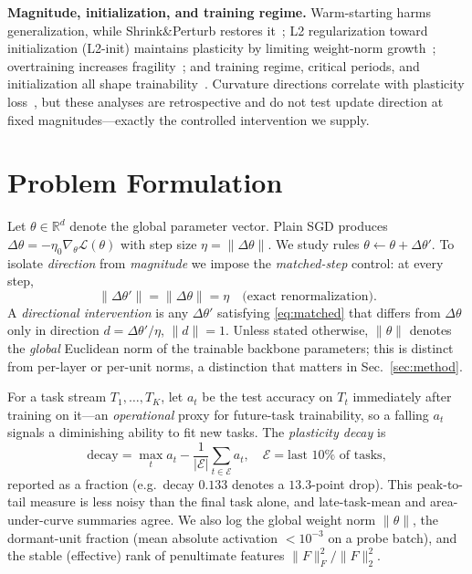 \documentclass[conference]{IEEEtran}
\begin{document}
\textbf{Magnitude, initialization, and training regime.} Warm-starting harms
generalization, while Shrink\&Perturb restores it~\cite{ash2020}; L2 regularization
toward initialization (L2-init) maintains plasticity by limiting weight-norm
growth~\cite{kumar2023}; overtraining increases fragility~\cite{springer2025}; and
training regime, critical periods, and initialization all shape
trainability~\cite{mirzadeh2020,achille2019,he2015,berariu2021,kingma2015adam}.
Curvature directions correlate with plasticity loss~\cite{lewandowski2023}, but
these analyses are retrospective and do not test update direction at fixed
magnitudes---exactly the controlled intervention we supply.

\section{Problem Formulation}\label{sec:formulation}
Let $\theta\in\mathbb{R}^{d}$ denote the global parameter vector. Plain SGD produces
$\Delta\theta=-\eta_0\nabla_\theta\mathcal{L}(\theta)$ with step size
$\eta=\lVert\Delta\theta\rVert$. We study rules $\theta\!\leftarrow\!\theta+\Delta\theta'$.
To isolate \emph{direction} from \emph{magnitude} we impose the
\emph{matched-step} control: at every step,
\begin{equation}
\lVert\Delta\theta'\rVert=\lVert\Delta\theta\rVert=\eta
\quad\text{(exact renormalization).}
\label{eq:matched}
\end{equation}
A \emph{directional intervention} is any $\Delta\theta'$ satisfying
\eqref{eq:matched} that differs from $\Delta\theta$ only in direction
$d=\Delta\theta'/\eta$, $\lVert d\rVert=1$. Unless stated otherwise,
$\lVert\theta\rVert$ denotes the \emph{global} Euclidean norm of the trainable
backbone parameters; this is distinct from per-layer or per-unit norms, a
distinction that matters in
 Sec.~\ref{sec:method}.

For a task stream ${T_1,\dots,T_K}$, let $a_t$ be the test accuracy on $T_t$
immediately after training on it---an \emph{operational} proxy for future-task
trainability, so a falling $a_t$ signals a diminishing ability to fit new tasks.
The \emph{plasticity decay} is
\begin{equation}
\mathrm{decay}=\max_t a_t-\frac{1}{|\mathcal{E}|}\sum_{t\in\mathcal{E}}a_t,
\quad \mathcal{E}=\text{last }10\%\text{ of tasks},
\label{eq:decay}
\end{equation}
reported as a fraction (e.g.\ decay $0.133$ denotes a $13.3$-point drop). This
peak-to-tail measure is less noisy than the final task alone, and late-task-mean and
area-under-curve summaries agree. We also log the global weight norm
$\lVert\theta\rVert$, the dormant-unit fraction (mean absolute activation
$<10^{-3}$ on a probe batch), and the stable (effective) rank of penultimate
features $\lVert F\rVert_F^{2}/\lVert F\rVert_2^{2}$.
\end{document}
